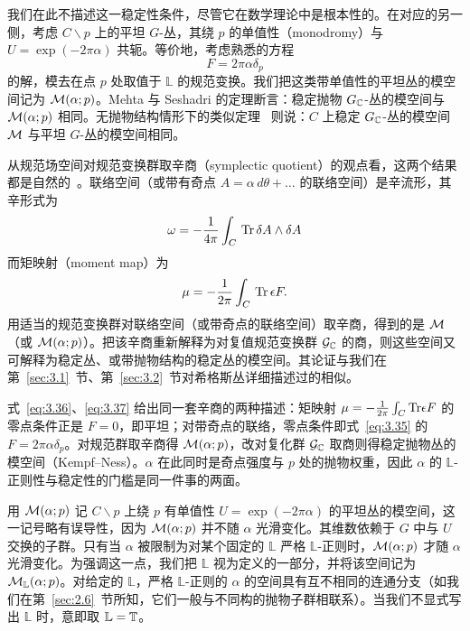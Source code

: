 我们在此不描述这一稳定性条件，尽管它在数学理论中是根本性的。在对应的另一侧，考虑 $C\backslash p$ 上的平坦 $G$-丛，其绕 $p$ 的单值性（monodromy）与 $U=\exp(-2\pi\alpha)$ 共轭。等价地，考虑熟悉的方程
\setcounter{equation}{34}
\begin{equation}\label{eq:3.35}
  F=2\pi\alpha\delta_p
\end{equation}
的解，模去在点 $p$ 处取值于 $\mathbb{L}$ 的规范变换。我们把这类带单值性的平坦丛的模空间记为 ${\mathcal{M}}(\alpha;p)$。Mehta 与 Seshadri 的定理断言：稳定抛物 $G_{\mathbb{C}}$-丛的模空间与 ${\mathcal{M}}(\alpha;p)$ 相同。无抛物结构情形下的类似定理~\cite{ref51} 则说：$C$ 上稳定 $G_{\mathbb{C}}$-丛的模空间 ${\mathcal{M}}$ 与平坦 $G$-丛的模空间相同。

从规范场空间对规范变换群取辛商（symplectic quotient）的观点看，这两个结果都是自然的~\cite{ref52}。联络空间（或带有奇点 $A=\alpha\,d\theta+\dots$ 的联络空间）是辛流形，其辛形式为
\setcounter{equation}{35}
\begin{equation}\label{eq:3.36}
  \omega=-{1\over
4\pi}\int_C\,{\rm Tr}\,\delta A\wedge \delta A
\end{equation}
而矩映射（moment map）为
\setcounter{equation}{36}
\begin{equation}\label{eq:3.37}
  \mu=-{1\over 2\pi}\int_C\,{\rm Tr}\,\epsilon F.
\end{equation}
用适当的规范变换群对联络空间（或带奇点的联络空间）取辛商，得到的是 ${\mathcal{M}}$（或 ${\mathcal{M}}(\alpha;p)$）。把该辛商重新解释为对复值规范变换群 $\mathcal{G}_{\mathbb{C}}$ 的商，则这些空间又可解释为稳定丛、或带抛物结构的稳定丛的模空间。其论证与我们在第~\ref{sec:3.1}~节、第~\ref{sec:3.2}~节对希格斯丛详细描述过的相似。

\begin{yizhu}[物理图像补充]式~\eqref{eq:3.36}、\eqref{eq:3.37} 给出同一套辛商的两种描述：矩映射 $\mu=-{1\over 2\pi}\int_C{\rm Tr}\epsilon F$ 的零点条件正是 $F=0$，即平坦；对带奇点的联络，零点条件即式~\eqref{eq:3.35} 的 $F=2\pi\alpha\delta_p$。对规范群取辛商得 ${\mathcal{M}}(\alpha;p)$，改对复化群 $\mathcal{G}_{\mathbb{C}}$ 取商则得稳定抛物丛的模空间（Kempf--Ness）。$\alpha$ 在此同时是奇点强度与 $p$ 处的抛物权重，因此 $\alpha$ 的 $\mathbb{L}$-正则性与稳定性的门槛是同一件事的两面。\end{yizhu}

用 ${\mathcal{M}}(\alpha;p)$ 记 $C\backslash p$ 上绕 $p$ 有单值性 $U=\exp(-2\pi\alpha)$ 的平坦丛的模空间，这一记号略有误导性，因为 ${\mathcal{M}}(\alpha;p)$ 并不随 $\alpha$ 光滑变化。其维数依赖于 $G$ 中与 $U$ 交换的子群。只有当 $\alpha$ 被限制为对某个固定的 $\mathbb{L}$ 严格 $\mathbb{L}$-正则时，${\mathcal{M}}(\alpha;p)$ 才随 $\alpha$ 光滑变化。为强调这一点，我们把 $\mathbb{L}$ 视为定义的一部分，并将该空间记为 ${\mathcal{M}}_\mathbb{L}(\alpha;p)$。对给定的 $\mathbb{L}$，严格 $\mathbb{L}$-正则的 $\alpha$ 的空间具有互不相同的连通分支（如我们在第~\ref{sec:2.6}~节所知，它们一般与不同构的抛物子群相联系）。当我们不显式写出 $\mathbb{L}$ 时，意即取 $\mathbb{L}={\mathbb{T}}$。

